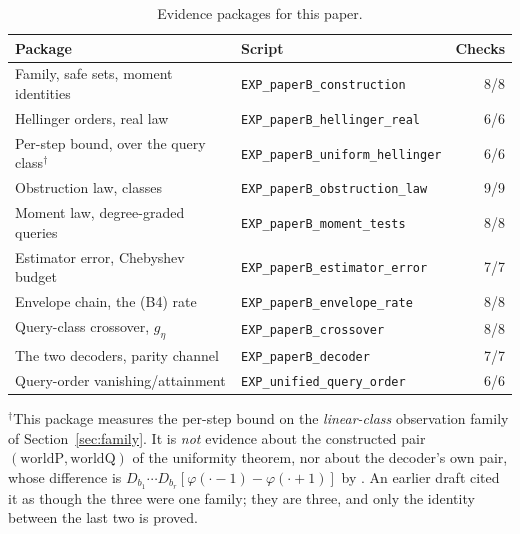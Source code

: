 \begin{table}[t]
\caption{Evidence packages for this paper.}
\label{tab:evidence}
\centering
\footnotesize
\begin{tabular}{@{}llr@{}}
\toprule
Package & Script & Checks \\
\midrule
Family, safe sets, moment identities & \texttt{EXP\_paperB\_construction} & 8/8 \\
Hellinger orders, real law & \texttt{EXP\_paperB\_hellinger\_real} & 6/6 \\
Per-step bound, over the query class$^{\dagger}$ & \texttt{EXP\_paperB\_uniform\_hellinger} & 6/6 \\
Obstruction law, classes & \texttt{EXP\_paperB\_obstruction\_law} & 9/9 \\
Moment law, degree-graded queries & \texttt{EXP\_paperB\_moment\_tests} & 8/8 \\
Estimator error, Chebyshev budget & \texttt{EXP\_paperB\_estimator\_error} & 7/7 \\
Envelope chain, the (B4) rate & \texttt{EXP\_paperB\_envelope\_rate} & 8/8 \\
Query-class crossover, $g_{\eta}$ & \texttt{EXP\_paperB\_crossover} & 8/8 \\
The two decoders, parity channel & \texttt{EXP\_paperB\_decoder} & 7/7 \\
Query-order vanishing/attainment & \texttt{EXP\_unified\_query\_order} & 6/6 \\
\bottomrule
\end{tabular}

\vspace{2pt}
{\footnotesize $^{\dagger}$This package measures the per-step bound on the \emph{linear-class}
observation family of Section~\ref{sec:family}. It is \emph{not} evidence about the
constructed pair $(\mathrm{worldP},\mathrm{worldQ})$ of the uniformity theorem, nor about the
decoder's own pair, whose difference is
$D_{b_{1}}\cdots D_{b_{r}}[\varphi(\cdot-1)-\varphi(\cdot+1)]$ by
. An earlier draft cited it as though the three were one family;
they are three, and only the identity between the last two is proved.}
\end{table}

